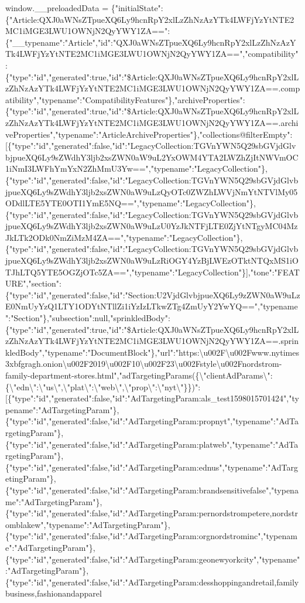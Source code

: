 window.\_\_preloadedData =
\{"initialState":\{"Article:QXJ0aWNsZTpueXQ6Ly9hcnRpY2xlLzZhNzAzYTk4LWFjYzYtNTE2MC1iMGE3LWU1OWNjN2QyYWY1ZA==":\{"\_\_typename":"Article","id":"QXJ0aWNsZTpueXQ6Ly9hcnRpY2xlLzZhNzAzYTk4LWFjYzYtNTE2MC1iMGE3LWU1OWNjN2QyYWY1ZA==","compatibility":\{"type":"id","generated":true,"id":"\$Article:QXJ0aWNsZTpueXQ6Ly9hcnRpY2xlLzZhNzAzYTk4LWFjYzYtNTE2MC1iMGE3LWU1OWNjN2QyYWY1ZA==.compatibility","typename":"CompatibilityFeatures"\},"archiveProperties":\{"type":"id","generated":true,"id":"\$Article:QXJ0aWNsZTpueXQ6Ly9hcnRpY2xlLzZhNzAzYTk4LWFjYzYtNTE2MC1iMGE3LWU1OWNjN2QyYWY1ZA==.archiveProperties","typename":"ArticleArchiveProperties"\},"collections@filterEmpty":{[}\{"type":"id","generated":false,"id":"LegacyCollection:TGVnYWN5Q29sbGVjdGlvbjpueXQ6Ly9sZWdhY3ljb2xsZWN0aW9uL2YxOWM4YTA2LWZhZjItNWVmOC1iNmI3LWFhYmYxN2ZhMmU3Yw==","typename":"LegacyCollection"\},\{"type":"id","generated":false,"id":"LegacyCollection:TGVnYWN5Q29sbGVjdGlvbjpueXQ6Ly9sZWdhY3ljb2xsZWN0aW9uLzQyOTc0ZWZhLWVjNmYtNTVlMy05ODdlLTE5YTE0OTI1YmE5NQ==","typename":"LegacyCollection"\},\{"type":"id","generated":false,"id":"LegacyCollection:TGVnYWN5Q29sbGVjdGlvbjpueXQ6Ly9sZWdhY3ljb2xsZWN0aW9uLzU0YzJkNTFjLTE0ZjYtNTgyMC04MzJkLTk2ODk0NmZiMzM4ZA==","typename":"LegacyCollection"\},\{"type":"id","generated":false,"id":"LegacyCollection:TGVnYWN5Q29sbGVjdGlvbjpueXQ6Ly9sZWdhY3ljb2xsZWN0aW9uLzRiOGY4YzBjLWEzOTktNTQxMS1iOTJhLTQ5YTE5OGZjOTc5ZA==","typename":"LegacyCollection"\}{]},"tone":"FEATURE","section":\{"type":"id","generated":false,"id":"Section:U2VjdGlvbjpueXQ6Ly9zZWN0aW9uLzE0NmUyYzQ1LTY1ODYtNTllZi1iYzIzLTkwZTg4ZmUyY2YwYQ==","typename":"Section"\},"subsection":null,"sprinkledBody":\{"type":"id","generated":true,"id":"\$Article:QXJ0aWNsZTpueXQ6Ly9hcnRpY2xlLzZhNzAzYTk4LWFjYzYtNTE2MC1iMGE3LWU1OWNjN2QyYWY1ZA==.sprinkledBody","typename":"DocumentBlock"\},"url":"https:\textbackslash{}u002F\textbackslash{}u002Fwww.nytimes3xbfgragh.onion\textbackslash{}u002F2019\textbackslash{}u002F10\textbackslash{}u002F23\textbackslash{}u002Fstyle\textbackslash{}u002Fnordstrom-family-department-stores.html","adTargetingParams(\{\textbackslash{}"clientAdParams\textbackslash{}":\{\textbackslash{}"edn\textbackslash{}":\textbackslash{}"us\textbackslash{}",\textbackslash{}"plat\textbackslash{}":\textbackslash{}"web\textbackslash{}",\textbackslash{}"prop\textbackslash{}":\textbackslash{}"nyt\textbackslash{}"\}\})":{[}\{"type":"id","generated":false,"id":"AdTargetingParam:als\_test1598015701424","typename":"AdTargetingParam"\},\{"type":"id","generated":false,"id":"AdTargetingParam:propnyt","typename":"AdTargetingParam"\},\{"type":"id","generated":false,"id":"AdTargetingParam:platweb","typename":"AdTargetingParam"\},\{"type":"id","generated":false,"id":"AdTargetingParam:ednus","typename":"AdTargetingParam"\},\{"type":"id","generated":false,"id":"AdTargetingParam:brandsensitivefalse","typename":"AdTargetingParam"\},\{"type":"id","generated":false,"id":"AdTargetingParam:pernordstrompetere,nordstromblakew","typename":"AdTargetingParam"\},\{"type":"id","generated":false,"id":"AdTargetingParam:orgnordstrominc","typename":"AdTargetingParam"\},\{"type":"id","generated":false,"id":"AdTargetingParam:geonewyorkcity","typename":"AdTargetingParam"\},\{"type":"id","generated":false,"id":"AdTargetingParam:desshoppingandretail,familybusiness,fashionandapparel
